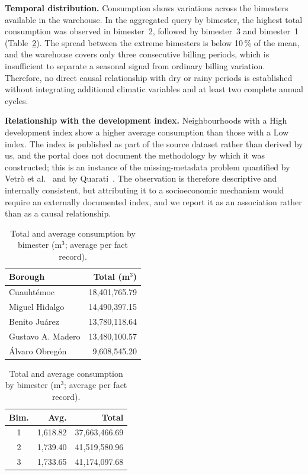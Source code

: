 \documentclass[runningheads]{llncs}
\renewcommand{\_}{\origunderscore\allowbreak}
\newif\ifshowchanges
\newcommand{\new}[1]{\ifshowchanges\textcolor{chg}{#1}\else#1\fi}
\begin{document}
\textbf{Temporal distribution.} Consumption shows variations across the
bimesters available in the warehouse. In the aggregated query by bimester, the
highest total consumption was observed in bimester~2, followed by bimester~3 and
bimester~1 (Table~\ref{tab:consumo_bimestre}). \new{The spread between the
extreme bimesters is below 10\,\% of the mean, and the warehouse covers only
three consecutive billing periods, which is insufficient to separate a seasonal
signal from ordinary billing variation.} Therefore, no direct causal relationship
with dry or rainy periods is established without integrating additional climatic
variables \new{and at least two complete annual cycles}.

\textbf{Relationship with the development index.} Neighbourhoods with a High
development index show a higher average consumption than those with a Low index.
\new{The index is published as part of the source dataset rather than derived by
us, and the portal does not document the methodology by which it was constructed;
this is an instance of the missing-metadata problem quantified by Vetr\`o et
al.~\cite{vetro2016} and by Quarati~\cite{quarati2023}. The observation is
therefore descriptive and internally consistent, but attributing it to a
socioeconomic mechanism would require an externally documented index, and we
report it as an association rather than as a causal relationship.}

\begin{table}[tbp]
\centering
\begin{minipage}[t]{0.52\textwidth}
\centering
\caption{Five boroughs with the highest total water consumption \new{(m$^3$,
aggregated over the three available bimesters)}.}
\label{tab:top5_alcaldias}
\footnotesize
\begin{tabular}{@{}lr@{}}
\toprule
\textbf{Borough} & \textbf{Total (m$^3$)} \\
\midrule
Cuauht\'emoc        & 18,401,765.79 \\
Miguel Hidalgo      & 14,490,397.15 \\
Benito Ju\'arez     & 13,780,118.64 \\
Gustavo A. Madero   & 13,480,100.57 \\
\'Alvaro Obreg\'on  &  9,608,545.20 \\
\bottomrule
\end{tabular}
\end{minipage}\hfill
\begin{minipage}[t]{0.44\textwidth}
\centering
\caption{Total and average consumption by bimester \new{(m$^3$; average per fact
record)}.}
\label{tab:consumo_bimestre}
\footnotesize
\begin{tabular}{@{}crr@{}}
\toprule
\textbf{Bim.} & \textbf{Avg.} & \textbf{Total} \\
\midrule
1 & 1,618.82 & 37,663,466.69 \\
2 & 1,739.40 & 41,519,580.96 \\
3 & 1,733.65 & 41,174,097.68 \\
\bottomrule
\end{tabular}
\end{minipage}
\end{table}
\end{document}
